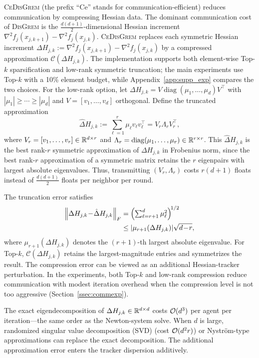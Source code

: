 \documentclass[review,onefignum,onetabnum]{siamart171218}
\begin{document}
	\textsc{CeDisGrem} (the prefix ``Ce'' stands for communication-efficient)
	reduces communication by compressing Hessian data.
	The dominant communication cost of \textsc{DisGrem} is the $\frac{d(d+1)}{2}$-dimensional
	Hessian increment $\nabla^2 f_j(x_{j,k+1})-\nabla^2 f_j(x_{j,k})$.
	\textsc{CeDisGrem} replaces each symmetric Hessian increment
	$\Delta H_{j,k}:=\nabla^2 f_j(x_{j,k+1})-\nabla^2 f_j(x_{j,k})$
	by a compressed approximation $\mathcal C(\Delta H_{j,k})$.
	The implementation supports both element-wise Top-$k$ sparsification
	and low-rank symmetric truncation; the main experiments use Top-$k$
	with a 10\% element budget, while Appendix~\ref{app:supp_exp}
	compares the two choices.
	For the low-rank option, let
	$\Delta H_{j,k}=V\operatorname{diag}(\mu_1,\dots,\mu_d)V^\top$ with
	$|\mu_1|\ge \cdots \ge |\mu_d|$ and $V=[v_1,\dots,v_d]$ orthogonal.
	Define the truncated approximation
	\[
	\hat\Delta H_{j,k}:=\sum_{\ell=1}^r \mu_\ell v_\ell v_\ell^\top
	= V_r\Lambda_r V_r^\top,
	\]
	where $V_r=[v_1,\dots,v_r]\in\mathbb{R}^{d\times r}$ and $\Lambda_r=\operatorname{diag}(\mu_1,\dots,\mu_r)\in\mathbb{R}^{r\times r}$.
	This $\hat\Delta H_{j,k}$ is the best rank-$r$ symmetric approximation of $\Delta H_{j,k}$ in Frobenius norm,
	since the best rank-$r$ approximation of a symmetric matrix retains the $r$ eigenpairs with largest absolute eigenvalues.
	Thus, transmitting $(V_r,\Lambda_r)$ costs $r(d+1)$ floats instead of $\frac{d(d+1)}{2}$ floats per neighbor per round.
	
	The truncation error satisfies
	\begin{align*}
		\left\|\Delta H_{j,k}\!-\!\hat\Delta H_{j,k}\right\|_F
		&=\Bigl(\textstyle\sum_{\ell=r+1}^d \mu_\ell^2\Bigr)^{\!1/2}\\
		&\le |\mu_{r+1}(\Delta H_{j,k})|\sqrt{d\!-\!r},
	\end{align*}
	where $\mu_{r+1}(\Delta H_{j,k})$ denotes the $(r+1)$-th largest absolute eigenvalue.
	For Top-$k$, $\mathcal C(\Delta H_{j,k})$ retains the largest-magnitude
	entries and symmetrizes the result.
	The compression error can be viewed as an additional Hessian-tracker
	perturbation. In the experiments, both Top-$k$ and low-rank compression reduce communication
	with modest iteration overhead when the compression level is not too
	aggressive (Section~\ref{ssec:commexp}).
	
	\begin{remark}
		The exact eigendecomposition of $\Delta H_{j,k}\in\mathbb{R}^{d\times d}$
		costs $\mathcal{O}(d^3)$ per agent per iteration---the same order as the
		Newton-system solve.
		When $d$ is large, randomized singular value decomposition (SVD)
		(cost $\mathcal{O}(d^2 r)$) or Nystr\"om-type approximations can replace
		the exact decomposition.
		The additional approximation error enters the tracker dispersion
	additively.
	\end{remark}
	
\end{document}
